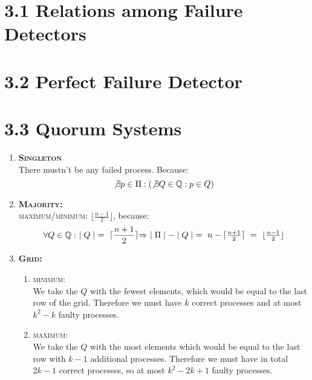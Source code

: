 \documentclass{article}
\begin{document}
	\pagestyle{fancy}
	
	\section*{3.1 Relations among Failure Detectors}
	\begin{adjustwidth}{2em}{2em}		
	\end{adjustwidth}
	
	\section*{3.2 Perfect Failure Detector}
	\begin{adjustwidth}{2em}{2em}		
	\end{adjustwidth}
	
	\section*{3.3 Quorum Systems}
	\begin{adjustwidth}{2em}{2em}
		\begin{enumerate}[\footnotesize{\textbullet}]
			\item \textsc{\textbf{Singleton}} \\
			There mustn't be any failed process. Because:
			\[
				\not\exists p \in \Pi : (\not\exists Q \in \mathbb{Q}: p \in Q)
			\]
			\item \textsc{\textbf{Majority:}} \\
			\textsc{maximum/minimum:} $\lfloor \frac{n-1}{2} \rfloor$, because:
			\[
				\forall Q \in \mathbb{Q}: \ \mid Q \mid \ = \ \lceil \frac{n+1}{2} \rceil $$ $$
				\Rightarrow \ \mid \Pi \mid - \mid Q \mid \ = \ n - \lceil \frac{n+1}{2} \rceil \ = \ \lfloor \frac{n-1}{2} \rfloor
			\]
			\item \textsc{\textbf{Grid:}}
			\begin{enumerate}[]
				\item \textsc{minimum:} \\
				We take the $Q$ with the fewest elements, which would be equal to the last row of the grid. Therefore we must have $k$ correct processes and at most $k^{2} - k$ faulty processes.
				\item \textsc{maximum:} \\
				We take the $Q$ with the most elements which would be equal to the last row with $k-1$ additional processes. Therefore we must have in total $2k-1$ correct processes, so at most $k^{2} - 2k +1$ faulty processes.
			\end{enumerate}
		\end{enumerate}
	\end{adjustwidth}
\end{document}
